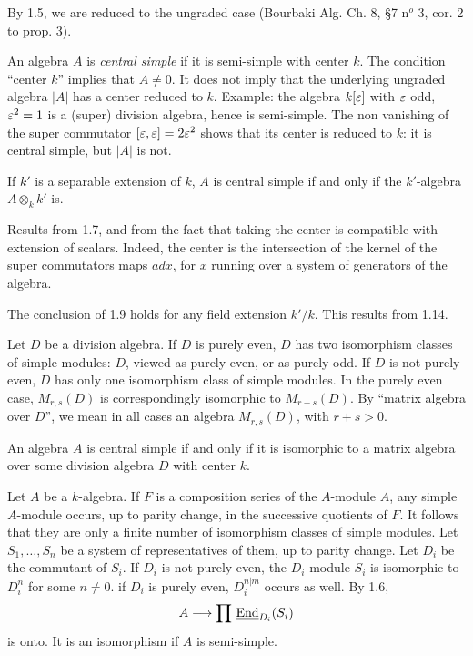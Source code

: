 By 1.5, we are reduced to the ungraded case (Bourbaki
Alg. Ch. 8, \S7 n$^o$ 3, cor. 2 to prop. 3).

\endsubhead
An algebra $A$ is {\it central simple} if it is
semi-simple with center $k$.
The condition ``center $k$'' implies that $A\not=0$.
It does not imply that the underlying ungraded algebra
$\vert A\vert$ has a center reduced to $k$.
Example: the algebra $k[{\varepsilon}]$ with ${\varepsilon}$ odd,
${\varepsilon}^2=1$ is a (super) division algebra, hence is
semi-simple.
The non vanishing of the super commutator
$[{\varepsilon},{\varepsilon}]=2{\varepsilon}^2$ shows that its center is reduced
to $k$: it is central simple, but $\vert A\vert$ is not.

If $k'$ is a separable extension of $k$, $A$ is central
simple if and only if the $k'$-algebra $A\otimes_k k'$
is.
\endproclaim

Results from 1.7, and from the fact that taking the center
is compatible with extension of scalars.
Indeed, the center is the intersection of the kernel of
the super commutators maps $adx$, for $x$ running over a
system of generators of the algebra.
\enddemo

The conclusion of 1.9 holds for any field extension
$k'/k$.
This results from 1.14.
\endremark

\endsubhead
Let $D$ be a division algebra.
If $D$ is purely even, $D$ has two isomorphism classes
of simple modules: $D$, viewed as purely even, or as
purely odd.
If $D$ is not purely even, $D$ has only one isomorphism
class of simple modules.
In the purely even case, $M_{r,s}(D)$ is
correspondingly isomorphic to $M_{r+s}(D)$.
By ``matrix algebra over $D$'', we mean in all cases an
algebra $M_{r,s}(D)$, with $r+s>0$.

An algebra $A$ is central simple if and only if it is
isomorphic to a matrix algebra over some division
algebra $D$ with center $k$.
\endproclaim

Let $A$ be a $k$-algebra.
If $F$ is a composition series of the $A$-module $A$,
any simple $A$-module occurs, up to parity change, in
the successive quotients of $F$.
It follows that they are only a finite number of
isomorphism classes of simple modules.
Let $S_1,\dotsc,S_n$ be a system of representatives of
them, up to parity change.
Let $D_i$ be the commutant of $S_i$.
If $D_i$ is not purely even, the $D_i$-module $S_i$ is
isomorphic to $D_i^n$ for some $n\not=0$.
if $D_i$ is purely even, $D_i^{n\vert m}$ occurs as
well.
By 1.6,
$$
A\longrightarrow \prod\,\underline{\text{\rm End}}_{D_i}(S_i)
$$
is onto.
It is an isomorphism if $A$ is semi-simple.
\enddemo

